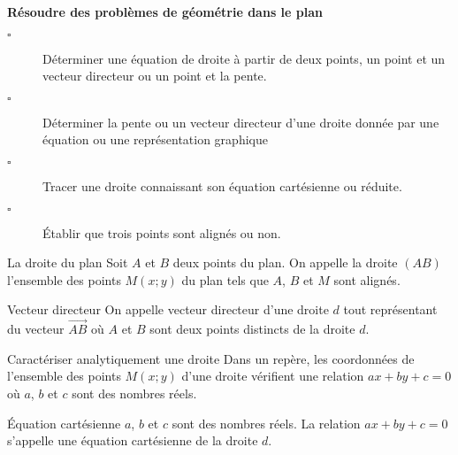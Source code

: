 \begin{titre}

\end{titre}


\begin{CpsCol}
\textbf{Résoudre des problèmes de géométrie dans le plan}
\begin{description}
\item[$\square$] Déterminer une équation de droite à partir de deux points, un point et un vecteur
directeur ou un point et la pente.
\item[$\square$] Déterminer la pente ou un vecteur directeur d’une droite donnée par une équation ou
une représentation graphique
\item[$\square$] Tracer une droite connaissant son équation cartésienne ou réduite.
\item[$\square$] Établir que trois points sont alignés ou non.
\end{description}
\end{CpsCol}



\begin{DefT}{La droite du plan}
Soit $A$ et $B$ deux points du plan. On appelle la droite $(AB)$ l'ensemble des points $M(x;y)$ du plan  tels que $A$, $B$ et $M$ sont alignés.
\end{DefT}



\begin{DefT}{Vecteur directeur}
On appelle vecteur directeur  d'une droite $d$ tout représentant du vecteur $\overrightarrow{AB}$ où $A$ et $B$ sont deux points distincts de la droite $d$.
\end{DefT}




\begin{ThT}{Caractériser analytiquement une droite}
Dans un repère, les coordonnées de l'ensemble des points $M(x;y)$ d'une droite vérifient une relation $ax+by+c =0$ où $a$, $b$ et $c$ sont des nombres réels.
\end{ThT}



\begin{DefT}{Équation cartésienne}
$a$, $b$ et $c$ sont des nombres réels. La relation $ax+by+c =0$ s'appelle une équation cartésienne  de la droite $d$.
\end{DefT}



